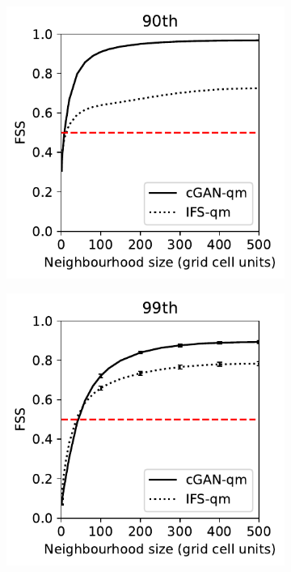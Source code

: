 \documentclass{article}
\begin{document}
\begin{figure}[t]
    \centering
     \begin{subfigure}[t]{0.32\textwidth}
    \centering
 \includegraphics[width=\textwidth]{images/fss_q90th_final-nologs_217600.pdf}
     \caption{}
     \end{subfigure}
     \centering
     \begin{subfigure}[t]{0.32\textwidth}
     \includegraphics[width=\textwidth]{images/fss_q99th_final-nologs_217600.pdf}

\end{subfigure}
\end{figure}
\end{document}
